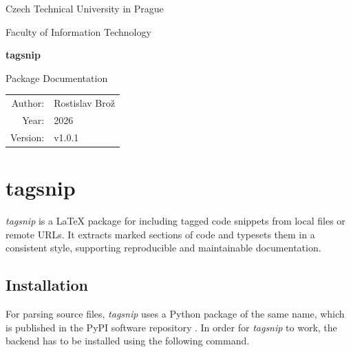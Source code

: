 \documentclass{article}
\begin{document}
\hypersetup{pageanchor=false}
\begin{titlepage}
    \centering

    {\Large Czech Technical University in Prague\par}
    {\Large Faculty of Information Technology\par}

    \vspace{3cm}

    {\Huge\bfseries tagsnip\par}

    \vspace{0.5cm}

    {\Large Package Documentation\par}

    \vfill

    \begin{tabular}{rl}
        Author: & Rostislav Brož \\
        Year: & 2026 \\
        Version: & v1.0.1 \\
    \end{tabular}

    \vspace{2cm}
\end{titlepage}

\hypersetup{pageanchor=true}
\clearpage
{}

\section*{tagsnip}

\textit{tagsnip} is a La\TeX{} package for including tagged code snippets from local files or remote URLs. 
It extracts marked sections of code and typesets them in a consistent style, 
supporting reproducible and maintainable documentation.

\subsection*{Installation}

For parsing source files, \textit{tagsnip} uses a Python package of the same name, 
which is published in the PyPI software repository \citep{pypi}. 
In order for \textit{tagsnip} to work, 
the backend has to be installed using the following command.

\end{document}
